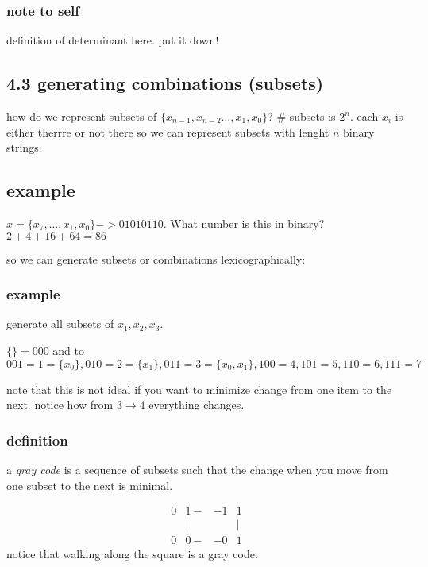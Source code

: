 \documentclass{article}
\begin{document}
\subsubsection*{note to self}
definition of determinant here. put it down!

\subsection*{4.3 generating combinations (subsets)}
how do we represent subsets of $\{x_{n-1},x_{n-2}\dots,x_1,x_0\}$?
\# subsets is $2^n$. each $x_i$ is either therrre or not there so we can represent subsets with lenght $n$ binary strings.
\subsection*{example}
$x=\{x_7,\dots,x_1,x_0\}->01010110$. What number is this in binary? $2+4+16+64=86$

so we can generate subsets or combinations lexicographically:
\subsubsection*{example}
generate all subsets of $x_1,x_2,x_3$.

$\{\}=000$ and to $001=1=\{x_0\},010=2=\{x_1\},011=3=\{x_0,x_1\},100=4,101=5,110=6,111=7$

note that this is not ideal if you want to minimize change from one item to the next. notice how from $3\to4$ everything changes.

\subsubsection*{definition}
a \emph{gray code} is a sequence of subsets such that the change when you move from one subset to the next is minimal.

\begin{align*}
  0&1-&-1&1\\
  &|&&|\\
  0&0-&-0&1
\end{align*}
notice that walking along the square is a gray code.
\end{document}
